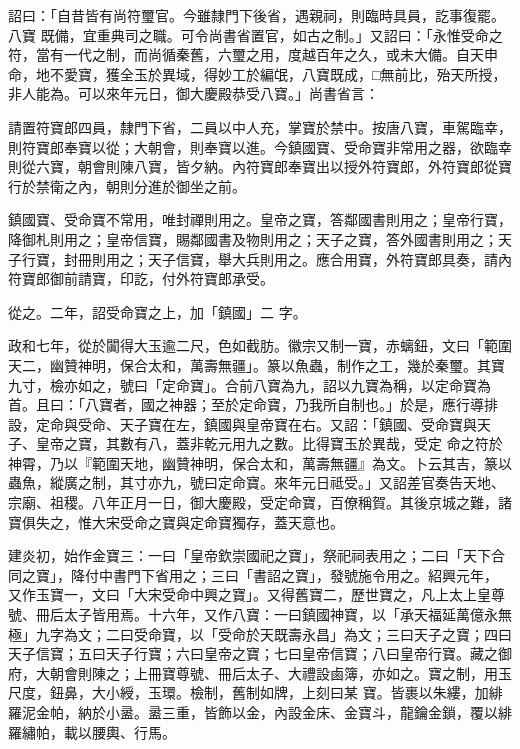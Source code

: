 \begin{pinyinscope}
 詔曰：「自昔皆有尚符璽官。今雖隸門下後省，遇親祠，則臨時具員，訖事復罷。八寶
 既備，宜重典司之職。可令尚書省置官，如古之制。」又詔曰：「永惟受命之符，當有一代之制，而尚循秦舊，六璽之用，度越百年之久，或未大備。自天申命，地不愛寶，獲全玉於異域，得妙工於編氓，八寶既成，□無前比，殆天所授，非人能為。可以來年元日，御大慶殿恭受八寶。」尚書省言：



 請置符寶郎四員，隸門下省，二員以中人充，掌寶於禁中。按唐八寶，車駕臨幸，則符寶郎奉寶以從；大朝會，則奉寶以進。今鎮國寶、受命寶非常用之器，欲臨幸
 則從六寶，朝會則陳八寶，皆夕納。內符寶郎奉寶出以授外符寶郎，外符寶郎從寶行於禁衛之內，朝則分進於御坐之前。



 鎮國寶、受命寶不常用，唯封禪則用之。皇帝之寶，答鄰國書則用之；皇帝行寶，降御札則用之；皇帝信寶，賜鄰國書及物則用之；天子之寶，答外國書則用之；天子行寶，封冊則用之；天子信寶，舉大兵則用之。應合用寶，外符寶郎具奏，請內符寶郎御前請寶，印訖，付外符寶郎承受。



 從之。二年，詔受命寶之上，加「鎮國」二
 字。



 政和七年，從於闐得大玉逾二尺，色如截肪。徽宗又制一寶，赤螭鈕，文曰「範圍天二，幽贊神明，保合太和，萬壽無疆」。篆以魚蟲，制作之工，幾於秦璽。其寶九寸，檢亦如之，號曰「定命寶」。合前八寶為九，詔以九寶為稱，以定命寶為首。且曰：「八寶者，國之神器；至於定命寶，乃我所自制也。」於是，應行導排設，定命與受命、天子寶在左，鎮國與皇帝寶在右。又詔：「鎮國、受命寶與天子、皇帝之寶，其數有八，蓋非乾元用九之數。比得寶玉於異哉，受定
 命之符於神霄，乃以『範圍天地，幽贊神明，保合太和，萬壽無疆』為文。卜云其吉，篆以蟲魚，縱廣之制，其寸亦九，號曰定命寶。來年元日祗受。」又詔差官奏告天地、宗廟、祖稷。八年正月一日，御大慶殿，受定命寶，百僚稱賀。其後京城之難，諸寶俱失之，惟大宋受命之寶與定命寶獨存，蓋天意也。



 建炎初，始作金寶三：一曰「皇帝欽崇國祀之寶」，祭祀祠表用之；二曰「天下合同之寶」，降付中書門下省用之；三曰「書詔之寶」，發號施令用之。紹興元年，
 又作玉寶一，文曰「大宋受命中興之寶」。又得舊寶二，歷世寶之，凡上太上皇尊號、冊后太子皆用焉。十六年，又作八寶：一曰鎮國神寶，以「承天福延萬億永無極」九字為文；二曰受命寶，以「受命於天既壽永昌」為文；三曰天子之寶；四曰天子信寶；五曰天子行寶；六曰皇帝之寶；七曰皇帝信寶；八曰皇帝行寶。藏之御府，大朝會則陳之；上冊寶尊號、冊后太子、大禮設鹵簿，亦如之。寶之制，用玉尺度，鈕鼻，大小綬，玉環。檢制，舊制如牌，上刻曰某
 寶。皆裹以朱縷，加緋羅泥金帕，納於小盝。盝三重，皆飾以金，內設金床、金寶斗，龍鑰金鎖，覆以緋羅繡帕，載以腰輿、行馬。




\end{pinyinscope}
